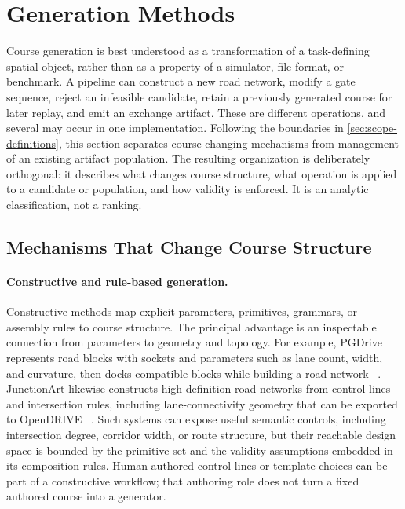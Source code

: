 \section{Generation Methods}
\label{sec:generation-methods}

Course generation is best understood as a transformation of a
task-defining spatial object, rather than as a property of a simulator, file
format, or benchmark.  A pipeline can construct a new road network, modify a
gate sequence, reject an infeasible candidate, retain a previously generated
course for later replay, and emit an exchange artifact.  These are different
operations, and several may occur in one implementation.  Following the
boundaries in \cref{sec:scope-definitions}, this section separates
course-changing mechanisms from management of an existing artifact population.
The resulting organization is deliberately orthogonal: it describes what
changes course structure, what operation is applied to a candidate or
population, and how validity is enforced.  It is an analytic classification, not
a ranking.

\subsection{Mechanisms That Change Course Structure}

\paragraph{Constructive and rule-based generation.}
Constructive methods map explicit parameters, primitives, grammars, or
assembly rules to course structure.  The principal advantage is an inspectable
connection from parameters to geometry and topology.  For example, PGDrive
represents road blocks with sockets and parameters such as lane count, width,
and curvature, then docks compatible blocks while building a road network
~\cite{Li2020ImprovingGeneralization}.  JunctionArt likewise constructs
high-definition road networks from control lines and intersection rules,
including lane-connectivity geometry that can be exported to OpenDRIVE
~\cite{Muktadir2023ProceduralGeneration}.  Such systems can expose useful
semantic controls, including intersection degree, corridor width, or route
structure, but their reachable design space is bounded by the primitive set and
the validity assumptions embedded in its composition rules.  Human-authored
control lines or template choices can be part of a constructive workflow; that
authoring role does not turn a fixed authored course into a generator.

